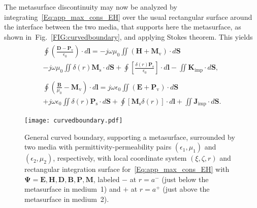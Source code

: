 \documentclass[journal,transaction]{IEEEtran}
\newcommand{\figref}{Fig.~\ref}
\newcommand{\ve}[1]{\mathbf{#1}}
\newcommand{\uve}[1]{\mathbf{\hat{#1}}}
\newcommand{\ves}[1]{\boldsymbol{#1}}
\begin{document}
The metasurface discontinuity may now be analyzed by integrating~\eqref{Eq:app_max_cons_EH} over the usual rectangular surface around the interface between the two media, that supports here the metasurface, as shown in~\figref{FIG:curvedboundary}, and applying Stokes theorem. This yields
%
\begin{subequations}\label{Eq:app_max_cons_int}
\begin{align}
\begin{split}
\oint \left(\frac{\ve{D}-\ve{P}_\text{v}}{\epsilon_0}\right)\cdot d\ve{l}=-j\omega\mu_0\iint(\ve{H}+\ve{M}_\text{v})\cdot d\ve{S}\\
-j\omega\mu_0\iint\delta(r)\ve{M}_\text{s}\cdot d\ve{S} +\oint\left[\frac{\delta(r)\ve{P}_\text{s}}{\epsilon_0}\right]\cdot d\ve{l}-\iint\ve{K}_\text{imp}\cdot d\ve{S},
\end{split}\\
\begin{split}
\oint  \left(\frac{\ve{B}}{\mu_0}-\ve{M}_\text{v}\right)\cdot d\ve{l}=j\omega\epsilon_0\iint(\ve{E}+\ve{P}_\text{v})\cdot d\ve{S}\\
+j\omega\epsilon_0\iint\delta(r)\ve{P}_\text{s}\cdot d\ve{S}+\oint[\ve{M}_\text{s}\delta(r)]\cdot d\ve{l}+\iint\ve{J}_\text{imp}\cdot d\ve{S}.
\end{split}
\end{align}
\end{subequations}

\begin{figure}[!h]
    \centering
         \texttt{[image: curvedboundary.pdf]}{
         }
        \caption{General curved boundary, supporting a metasurface, surrounded by two media with permittivity-permeability pairs $(\epsilon_1,\mu_1)$ and $(\epsilon_2,\mu_2)$, respectively, with local coordinate system $(\xi,\zeta,r)$ and rectangular integration surface for~\eqref{Eq:app_max_cons_EH} with $\ves{\Psi}=\ve{E},\ve{H},\ve{D},\ve{B},\ve{P},\ve{M}$, labeled $-$ at $r=a^-$ (just below the metasurface in medium~1) and $+$ at $r=a^+$ (just above the metasurface in medium~2).}
   \label{FIG:curveboundary}
\end{figure}
\end{document}
